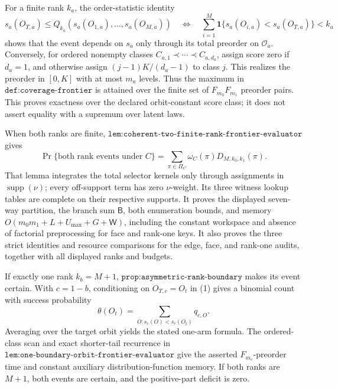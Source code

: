 For a finite rank \(k_a\), the order-statistic identity
\[
s_a(O_{T,a})\le Q_{k_a}(s_a(O_{1,a}),\ldots,s_a(O_{M,a}))
\quad\Longleftrightarrow\quad
\sum_{i=1}^M\mathbf 1\{s_a(O_{i,a})<s_a(O_{T,a})\}<k_a
\tag{1}
\]
shows that the event depends on \(s_a\) only through its total preorder on \(\mathcal O_a\). Conversely, for ordered nonempty classes \(C_{a,1}\prec\cdots\prec C_{a,d_a}\), assign score zero if \(d_a=1\), and otherwise assign \((j-1)K/(d_a-1)\) to class \(j\). This realizes the preorder in \([0,K]\) with at most \(m_a\) levels. Thus the maximum in \(\texttt{def:coverage-frontier}\) is attained over the finite set of \(F_{m_0}F_{m_1}\) preorder pairs. This proves exactness over the declared orbit-constant score class; it does not assert equality with a supremum over latent laws.

When both ranks are finite, \(\texttt{lem:coherent-two-finite-rank-frontier-evaluator}\) gives
\[
\Pr\{\text{both rank events under }C\}
=\sum_{\pi\in\Pi_C}\omega_C(\pi)D_{M,k_0,k_1}(\pi).
\tag{2}
\]
That lemma integrates the total selector kernels only through assignments in \(\operatorname{supp}(\nu)\); every off-support term has zero \(\nu\)-weight. Its three witness lookup tables are complete on their respective supports. It proves the displayed seven-way partition, the branch sum \(\mathsf B\), both enumeration bounds, and memory \(O(m_0m_1+L+U_{\max}+G+\mathsf W)\), including the constant workspace and absence of factorial preprocessing for face and rank-one keys. It also proves the three strict identities and resource comparisons for the edge, face, and rank-one audits, together with all displayed ranks and budgets.

If exactly one rank \(k_b=M+1\), \(\texttt{prop:asymmetric-rank-boundary}\) makes its event certain. With \(c=1-b\), conditioning on \(O_{T,c}=O_t\) in (1) gives a binomial count with success probability
\[
\theta(O_t)=\sum_{O:s_c(O)<s_c(O_t)}q_{c,O}.
\]
Averaging over the target orbit yields the stated one-arm formula. The ordered-class scan and exact shorter-tail recurrence in \(\texttt{lem:one-boundary-orbit-frontier-evaluator}\) give the asserted \(F_{m_c}\)-preorder time and constant auxiliary distribution-function memory. If both ranks are \(M+1\), both events are certain, and the positive-part deficit is zero.

